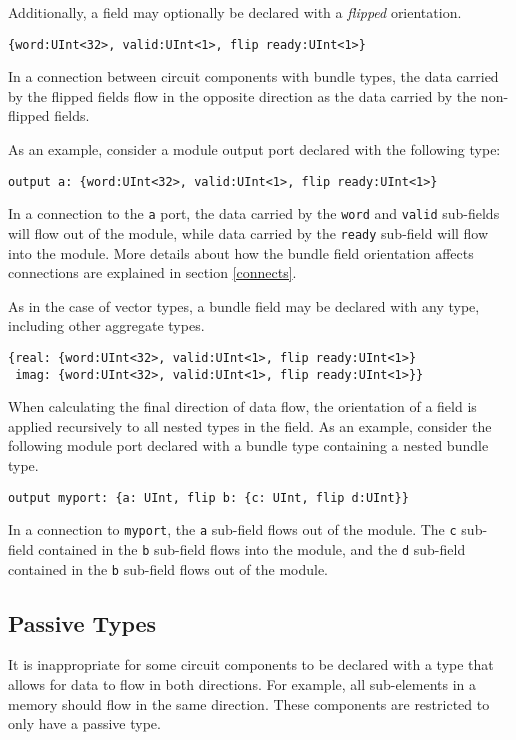 \documentclass[12pt]{article}
\begin{document}
Additionally, a field may optionally be declared with a {\em flipped} orientation.
\begin{lstlisting}
{word:UInt<32>, valid:UInt<1>, flip ready:UInt<1>}
\end{lstlisting}
In a connection between circuit components with bundle types, the data carried by the flipped fields flow in the opposite direction as the data carried by the non-flipped fields.

As an example, consider a module output port declared with the following type:
\begin{lstlisting}
output a: {word:UInt<32>, valid:UInt<1>, flip ready:UInt<1>}
\end{lstlisting}
In a connection to the \verb|a| port, the data carried by the \verb|word| and \verb|valid| sub-fields will flow out of the module, while data carried by the \verb|ready| sub-field will flow into the module. More details about how the bundle field orientation affects connections are explained in section \ref{connects}.

As in the case of vector types, a bundle field may be declared with any type, including other aggregate types.
\begin{lstlisting}
{real: {word:UInt<32>, valid:UInt<1>, flip ready:UInt<1>}
 imag: {word:UInt<32>, valid:UInt<1>, flip ready:UInt<1>}}
\end{lstlisting}

When calculating the final direction of data flow, the orientation of a field is applied recursively to all nested types in the field. As an example, consider the following module port declared with a bundle type containing a nested bundle type.
\begin{lstlisting}
output myport: {a: UInt, flip b: {c: UInt, flip d:UInt}}
\end{lstlisting}
In a connection to \verb|myport|, the \verb|a| sub-field flows out of the module. The \verb|c| sub-field contained in the \verb|b| sub-field flows into the module, and the \verb|d| sub-field contained in the \verb|b| sub-field flows out of the module.

\subsection{Passive Types} \label{passive_types}

It is inappropriate for some circuit components to be declared with a type that allows for data to flow in both directions. For example, all sub-elements in a memory should flow in the same direction. These components are restricted to only have a passive type.
\end{document}
